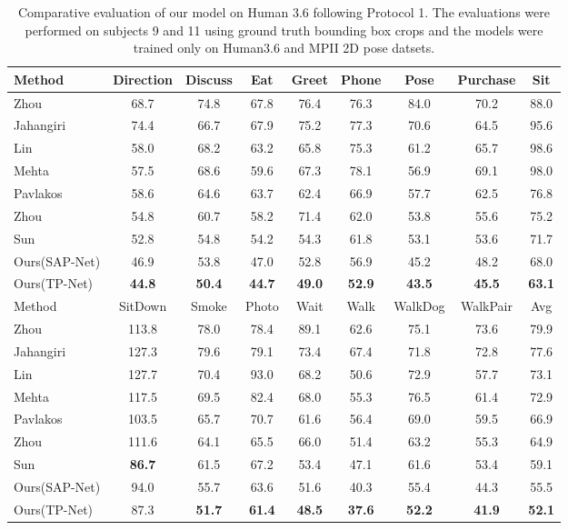 \documentclass[runningheads]{llncs}
\begin{document}
\begin{table*}[t]
\centering
\begin{tabular}{l  c  c  c  c  c  c  c  c }
\hline
Method & Direction & Discuss & Eat & Greet & Phone & Pose & Purchase & Sit \\
\hline
\hline
Zhou~\cite{zhou2016sparseness} & 68.7 & 74.8 & 67.8 & 76.4 & 76.3 & 84.0 & 70.2 & 88.0 \\
Jahangiri~\cite{Jahangiri:ICCV2017} & 74.4 & 66.7 & 67.9 & 75.2 & 77.3 & 70.6 & 64.5 & 95.6 \\
Lin~\cite{Lin_2017_CVPR} & 58.0 & 68.2 & 63.2 & 65.8 & 75.3 & 61.2 & 65.7 & 98.6 \\
Mehta~\cite{mono-3dhp2017}  & 57.5 & 68.6 & 59.6 & 67.3 & 78.1 & 56.9 & 69.1 & 98.0 \\
Pavlakos~\cite{Pavlakos_2017_CVPR} & 58.6 & 64.6 & 63.7 & 62.4 & 66.9 & 57.7 & 62.5 & 76.8 \\
Zhou~\cite{Zhou_2017_ICCV} & 54.8 & 60.7 & 58.2 & 71.4 & 62.0 & 53.8 & 55.6 & 75.2 \\
Sun~\cite{Sun_2017_ICCV} & 52.8 & 54.8 & 54.2 & 54.3 & 61.8 & 53.1 & 53.6 & 71.7 \\
\hline
Ours(SAP-Net) & 46.9 & 53.8 & 47.0 & 52.8 & 56.9 & 45.2 & 48.2 & 68.0  \\
Ours(TP-Net) & \textbf{44.8} & \textbf{50.4} & \textbf{44.7} & \textbf{49.0} & \textbf{52.9} & \textbf{43.5} & \textbf{45.5} & \textbf{63.1} \\

\hline
\hline
Method & SitDown & Smoke & Photo & Wait & Walk & WalkDog & WalkPair & Avg \\
\hline
\hline
Zhou~\cite{zhou2016sparseness} & 113.8 & 78.0 & 78.4 & 89.1 & 62.6 & 75.1 & 73.6 & 79.9 \\
Jahangiri~\cite{Jahangiri:ICCV2017} & 127.3 & 79.6 & 79.1 & 73.4 & 67.4 & 71.8 & 72.8 & 77.6 \\
Lin~\cite{Lin_2017_CVPR} & 127.7 & 70.4 & 93.0 & 68.2 & 50.6 & 72.9 & 57.7 & 73.1 \\
Mehta~\cite{mono-3dhp2017} & 117.5 & 69.5 & 82.4 & 68.0 & 55.3 & 76.5 & 61.4 & 72.9 \\
Pavlakos~\cite{Pavlakos_2017_CVPR} & 103.5 & 65.7 & 70.7 & 61.6 & 56.4 & 69.0 & 59.5 & 66.9 \\
Zhou~\cite{Zhou_2017_ICCV}& 111.6 & 64.1 & 65.5 & 66.0 & 51.4 & 63.2 & 55.3 & 64.9 \\
Sun~\cite{Sun_2017_ICCV}& \textbf{86.7} & 61.5 & 67.2 & 53.4 & 47.1 & 61.6 & 53.4 & 59.1 \\
\hline
Ours(SAP-Net) & 94.0 & 55.7 & 63.6 & 51.6 & 40.3 & 55.4 & 44.3 & 55.5 \\
Ours(TP-Net) & 87.3 & \textbf{51.7} & \textbf{61.4} & \textbf{48.5} & \textbf{37.6} & \textbf{52.2} & \textbf{41.9} & \textbf{52.1} \\
\hline
\end{tabular}
\vskip 2mm
\caption{Comparative evaluation of our model on Human 3.6 following Protocol 1. The evaluations were performed on subjects 9 and 11 using ground truth bounding box crops and the models were trained only on Human3.6 and MPII 2D pose datsets.} \label{tab: h36mp1}
\vspace{-2em}
\end{table*}
\end{document}
